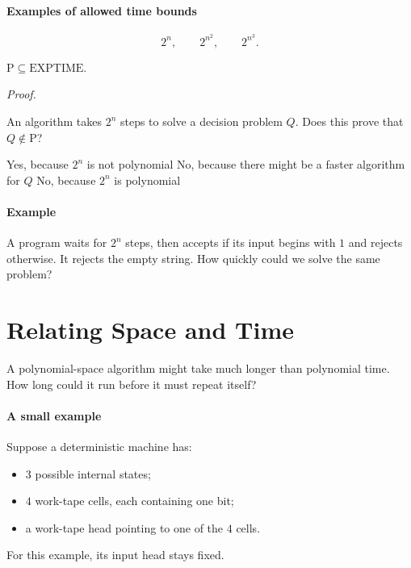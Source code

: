 \documentclass[11  pt]{article}
\begin{document}
\paragraph{Examples of allowed time bounds}
\begin{equation*}
    2^n, \qquad 2^{n^2}, \qquad 2^{n^3}.
\end{equation*}

\begin{theorem}
    $\mathrm{P}\subseteq\mathrm{EXPTIME}$.
\end{theorem}
\textit{Proof.}
\vs{1.5cm}

\begin{Qu}
    An algorithm takes $2^n$ steps to solve a decision problem $Q$. Does this prove that $Q\notin\mathrm{P}$?
    \begin{itemize}
        \aitem Yes, because $2^n$ is not polynomial
        \bitem No, because there might be a faster algorithm for $Q$
        \citem No, because $2^n$ is polynomial
    \end{itemize}
\end{Qu}

\paragraph{Example}
A program waits for $2^n$ steps, then accepts if its input begins with $1$ and rejects otherwise. It rejects the empty string. How quickly could we solve the same problem?
\vs{1cm}


\newpage
\section{Relating Space and Time}
A polynomial-space algorithm might take much longer than polynomial time. How long could it run before it must repeat itself?

\paragraph{A small example}
Suppose a deterministic machine has:
\begin{itemize}
    \item $3$ possible internal states;
    \item $4$ work-tape cells, each containing one bit;
    \item a work-tape head pointing to one of the $4$ cells.
\end{itemize}
For this example, its input head stays fixed.
\end{document}
